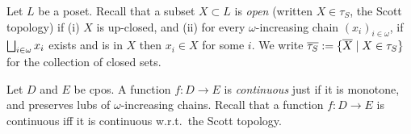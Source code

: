 

Let $L$ be a poset. 
Recall that a subset $X \subset L$ is \emph{open} (written $X \in \tau_S$, the Scott topology) if (i) $X$ is up-closed, and (ii) for every $\omega$-increasing chain $(x_i)_{i \in \omega}$, if $\bigsqcup_{i \in \omega} x_i$ exists and is in $X$ then $x_i \in X$ for some $i$. 
We write $\overline{\tau_S} := \{\overline X \mid X \in \tau_S\}$ for the collection of closed sets.


Let $D$ and $E$ be cpos. 
A function $f:D \to E$ is \emph{continuous} just if it is monotone, and preserves lubs of $\omega$-increasing chains.
Recall that a function $f : D \to E$ is continuous iff it is continuous w.r.t.~the Scott topology.

